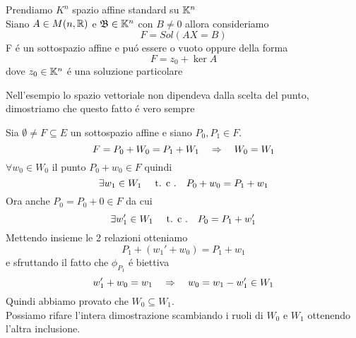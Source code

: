 \begin{ese}Prendiamo $K^n$ spazio affine standard su $\mathbb{K}^n$\\
Siano $A \in M(n,\mathbb{R})$ e $\mathfrak{B} \in \mathbb{K}^n$ con $B \neq 0 $ allora consideriamo 
$$ F = Sol ( AX=B )$$
F \'e un sottospazio affine e  pu\'o essere o vuoto oppure
della forma
$$ F = z_0 + \ker A $$
dove $z_0 \in \mathbb{K}^n$ \'e una soluzione particolare 
\end{ese}
\begin{oss}
Nell'esempio  lo spazio vettoriale non dipendeva dalla scelta del punto, dimostriamo che questo fatto \'e vero sempre
\end{oss}
\begin{lem} Sia $\emptyset \neq F \subseteq E $ un sottospazio affine e siano $P_0, P_1 \in F $.
$$ F = P_0 + W_0 = P_1 + W_1 \quad \Rightarrow \quad W_0=W_1 $$
\proof $\forall w_0 \in W_0 $ il punto $P_0 + w_0 \in F $ quindi 
$$\exists w_1 \in W_1 \quad \text{ t. c .} \quad
P_0 + w_0 = P_1 + w_1 $$ 
Ora anche $P_0 = P_0 + 0 \in F $ da cui
$$ \exists w_1' \in W_1 \quad \text{ t. c .} \quad P_0 = P_1 + w_1'$$ 
Mettendo insieme le 2 relazioni otteniamo
$$ P_1 + ( w_1' + w_0 ) = P_1 + w_1$$ 
e sfruttando il fatto che $\phi_{P_1}$ \'e biettiva
$$ w_1' + w_0 = w_1 \quad \Rightarrow \quad w_0= w_1 - w_1' \in W_1$$
Quindi abbiamo provato che $ W_0 \subseteq W_1$.\\
Possiamo rifare l'intera dimostrazione scambiando i ruoli di $W_0$ e $W_1$ ottenendo l'altra inclusione.\\
\endproof
\end{lem}

